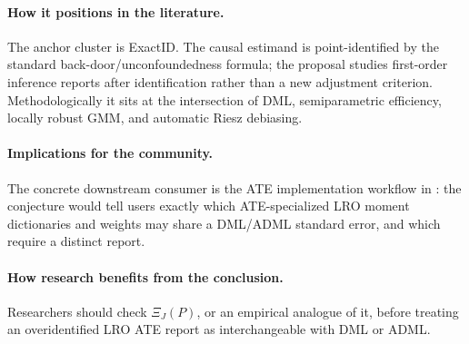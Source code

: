 \documentclass[11pt]{article}
\theoremstyle{definition}
\theoremstyle{plain}
\theoremstyle{remark}
\begin{document}
\paragraph{How it positions in the literature.}
The anchor cluster is ExactID.  The causal estimand is point-identified by the
standard back-door/unconfoundedness formula; the proposal studies first-order
inference reports after identification rather than a new adjustment criterion.
Methodologically it sits at the intersection of DML, semiparametric efficiency,
locally robust GMM, and automatic Riesz debiasing.

\paragraph{Implications for the community.}
The concrete downstream consumer is the ATE implementation workflow in
\citet{ChernozhukovEscancianoIchimuraNeweyRobins2022LRO}: the conjecture would
tell users exactly which ATE-specialized LRO moment dictionaries and weights
may share a DML/ADML standard error, and which require a distinct report.

\paragraph{How research benefits from the conclusion.}
Researchers should check \(\Xi_J(P)\), or an empirical analogue of it, before
treating an overidentified LRO ATE report as interchangeable with DML or ADML.
\end{document}
